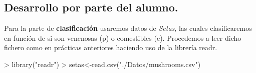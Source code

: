 \documentclass [a4paper] {article}
\begin{document}
\subsection{Desarrollo por parte del alumno.}

\bigskip
Para la parte de \textbf{clasificación} usaremos datos de \textit{Setas}, las cuales clasificaremos en función de si son venenosas (p) o 
comestibles (e). Procedemos a leer dicho fichero como en prácticas anteriores haciendo uso de la librería readr.
\begin{Schunk}
\begin{Sinput}
> library("readr")
> setas<-read.csv("./Datos/mushrooms.csv")
\end{Sinput}
\end{Schunk}
\end{document}
